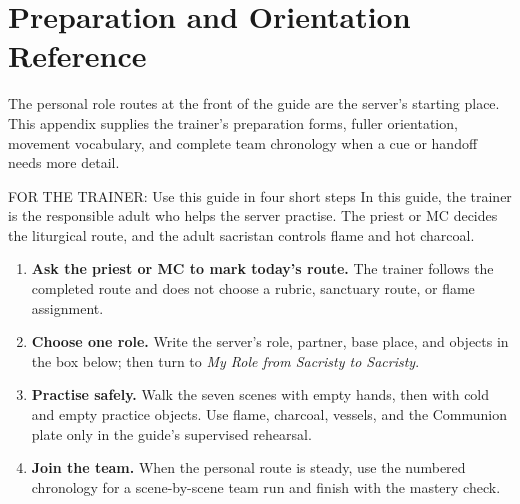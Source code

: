 \Needspace{0.43\textheight}
\section{Preparation and Orientation Reference}

The personal role routes at the front of the guide are the server's starting
place. This appendix supplies the trainer's preparation forms, fuller
orientation, movement vocabulary, and complete team chronology when a cue or
handoff needs more detail.

\begin{coachbox}{FOR THE TRAINER: Use this guide in four short steps}
In this guide, the trainer is the responsible adult who helps the server
practise. The priest or MC decides the liturgical route, and the adult
sacristan controls flame and hot charcoal.

\begin{enumerate}[leftmargin=1.5em]
\item \textbf{Ask the priest or MC to mark today's route.} The trainer follows
the completed route and does not choose a rubric, sanctuary route, or flame
assignment.
\item \textbf{Choose one role.}  Write the server's role, partner, base place,
and objects in the box below; then turn to \emph{My Role from Sacristy to
Sacristy}.
\item \textbf{Practise safely.}  Walk the seven scenes with empty hands, then
with cold and empty practice objects.  Use flame, charcoal, vessels, and the
Communion plate only in the guide's supervised rehearsal.
\item \textbf{Join the team.}  When the personal route is steady, use the
numbered chronology for a scene-by-scene team run and finish with the mastery
check.
\end{enumerate}
\end{coachbox}

